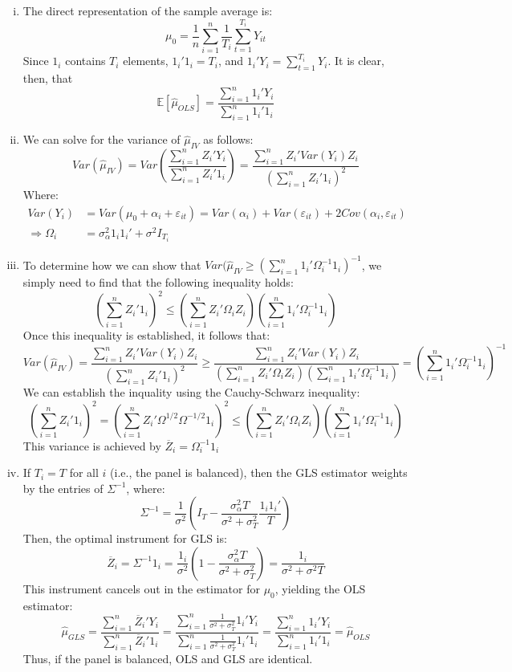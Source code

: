 \documentclass{article}
\newcommand{\sumn}{\sum_{i=1}^{n}}
\newcommand{\E}[1]{\mathbb{E}\left[#1\right]}%
\begin{document}
\begin{enumerate}[(i)]
	\item The direct representation of the sample average is:
		\[
			\mu_0 = \frac{1}{n}\sumn \frac{1}{T_i}\sum_{t=1}^{T_i} Y_{it}
		\]
		Since $1_i$ contains $T_i$ elements, ${1_i'1_i=T_i}$, and ${1_i'Y_i=\sum_{t=1}^{T_i}Y_i}$. It is clear, then, that
		\[
			\E{\hat{\mu}_{OLS}} = \frac{\sumn 1_i'Y_i}{\sumn1_i'1_i}
		\]
	
	
	\item We can solve for the variance of $\hat{\mu}_{IV}$ as follows:
		\[
			Var(\hat{\mu}_{IV})	= Var\left(\frac{\sumn Z_i'Y_i}{\sumn Z_i'1_i}\right) = \frac{\sumn Z_i'Var(Y_i)Z_i}{\left(\sumn Z_i'1_i\right)^2}	
		\]
		Where:
		\begin{align*}
						Var(Y_i) 	&= Var(\mu_0 + \alpha_i + \varepsilon_{it}) = Var(\alpha_i) + Var(\varepsilon_{it}) + 2Cov(\alpha_i,\varepsilon_{it})	\\
			\Rightarrow \Omega_i	&= \sigma^2_\alpha1_i1_i' + \sigma^2I_{T_i}
		\end{align*}
	
	\pagebreak
	\item To determine how we can show that ${Var(\hat{\mu}_{IV}\geq\left(\sumn 1_i'\Omega_i^{-1}1_i\right)^{-1}}$, we simply need to find that the following inequality holds:
		\[
			\left(\sumn Z_i'1_i\right)^2 \leq \left(\sumn Z_i'\Omega_iZ_i\right)\left(\sumn 1_i'\Omega_i^{-1}1_i\right)
		\]
		Once this inequality is established, it follows that:
		{\small \[
			Var(\hat{\mu}_{IV})	= 		\frac{\sumn Z_i'Var(Y_i)Z_i}{\left(\sumn Z_i'1_i\right)^2}
								\geq 	\frac{\sumn Z_i'Var(Y_i)Z_i}{\left(\sumn Z_i'\Omega_iZ_i\right)\left(\sumn 1_i'\Omega_i^{-1}1_i\right)}
								= 		\left(\sumn 1_i'\Omega_i^{-1}1_i\right)^{-1}
		\] }
		We can establish the inquality using the Cauchy-Schwarz inequality:
		\[
			\left(\sumn Z_i'1_i\right)^2 = 		\left(\sumn Z_i'\Omega^{1/2}\Omega^{-1/2}1_i\right)^2  					
										 \leq 	\left(\sumn Z_i'\Omega_iZ_i\right)\left(\sumn 1_i'\Omega_i^{-1}1_i\right)
		\]
		This variance is achieved by ${\overline{Z}_i=\Omega_i^{-1}1_i}$
		
	\item If $T_i=T$ for all $i$ (i.e., the panel is balanced), then the GLS estimator weights by the entries of $\Sigma^{-1}$, where:
		\[
			\Sigma^{-1} = \frac{1}{\sigma^2}\left(I_T - \frac{\sigma^2_\alpha T}{\sigma^2 + \sigma^2_T}\frac{1_i1_i'}{T}\right)
		\]
		Then, the optimal instrument for GLS is:
		\[
			\overline{Z}_i	= \Sigma^{-1}1_i = \frac{1_i}{\sigma^2}\left(1 - \frac{\sigma^2_\alpha T}{\sigma^2 + \sigma^2_T}\right)
							= \frac{1_i}{\sigma^2 + \sigma^2T}
		\]
		This instrument cancels out in the estimator for $\mu_0$, yielding the OLS estimator:
		\[
			\hat{\mu}_{GLS} = \frac{\sumn \overline{Z}_i'Y_i}{\sumn\overline{Z}_i'1_i} 
							= \frac{\sumn \frac{1}{\sigma^2 + \sigma^2_T}1_i'Y_i}{\sumn\frac{1}{\sigma^2 + \sigma^2_T}1_i'1_i} 
							= \frac{\sumn 1_i'Y_i}{\sumn1_i'1_i} = \hat{\mu}_{OLS}
		\]
		Thus, if the panel is balanced, OLS and GLS are identical.
	

\end{enumerate}
\end{document}
